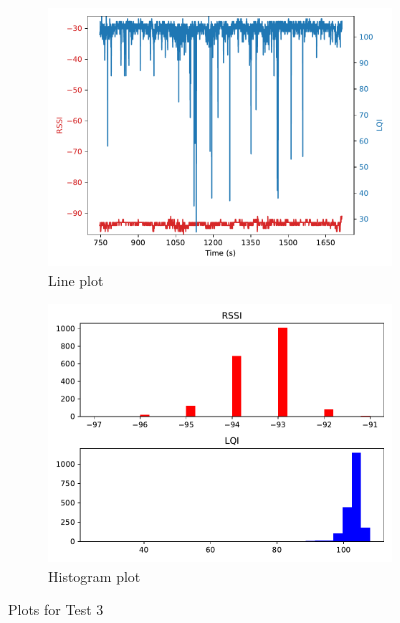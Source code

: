 \documentclass[runningheads]{llncs}
\begin{document}
\begin{figure}[ht]
    \centering
    \begin{subfigure}[b]{0.45\textwidth}
        \centering
        \includegraphics[width=\textwidth]{images/1-50--24-26-line.pdf}
        \caption{Line plot}
    \end{subfigure}
    \hfill
    \begin{subfigure}[b]{0.45\textwidth}
        \centering
        \includegraphics[width=\textwidth]{images/1-50--24-26-histogram.pdf}
        \caption{Histogram plot}
    \end{subfigure}
    \caption{Plots for Test 3}
\end{figure}
\end{document}
